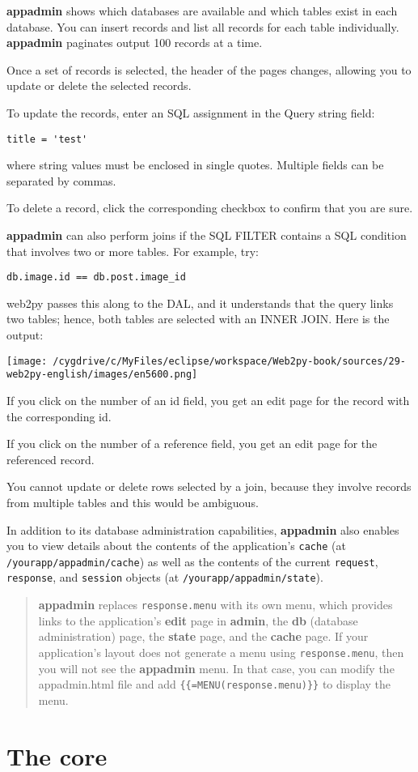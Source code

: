 \documentclass[justified,sixbynine,notoc]{tufte-book}
\def\ft{\small\tt}
\begin{document}
\begin{fullwidth}
{\bf appadmin} shows which databases are available and which tables exist in each database. You can insert records and list all records for each table individually. {\bf appadmin} paginates output 100 records at a time.

Once a set of records is selected, the header of the pages changes, allowing you to update or delete the selected records.

To update the records, enter an SQL assignment in the Query string field:
\begin{lstlisting}
title = 'test'
\end{lstlisting}
\noindent where string values must be enclosed in single quotes. Multiple fields can be separated by commas.

To delete a record, click the corresponding checkbox to confirm that you are sure.

{\bf appadmin} can also perform joins if the SQL FILTER contains a SQL condition that involves two or more tables. For example, try:
\begin{lstlisting}
db.image.id == db.post.image_id
\end{lstlisting}
\noindent web2py passes this along to the DAL, and it understands that the query links two tables; hence, both tables are selected with an INNER JOIN. Here is the output:


\goodbreak\begin{center}\texttt{[image: /cygdrive/c/MyFiles/eclipse/workspace/Web2py-book/sources/29-web2py-english/images/en5600.png]}\end{center}


If you click on the number of an id field, you get an edit page for the record with the corresponding id.

If you click on the number of a reference field, you get an edit page for the referenced record.

You cannot update or delete rows selected by a join, because they involve records from multiple tables and this would be ambiguous.

In addition to its database administration capabilities, {\bf appadmin} also enables you to view details about the contents of the application's {\ft cache} (at {\ft /yourapp/appadmin/cache}) as well as the contents of the current {\ft request}, {\ft response}, and {\ft session} objects (at {\ft /yourapp/appadmin/state}).

\begin{quote}{\bf appadmin} replaces {\ft response.menu} with its own menu, which provides links to the application's {\bf edit} page in {\bf admin}, the {\bf db} (database administration) page, the {\bf state} page, and the {\bf cache} page. If your application's layout does not generate a menu using {\ft response.menu}, then you will not see the {\bf appadmin} menu. In that case, you can modify the appadmin.html file and add {\ft \{\{=MENU(response.menu)\}\}} to display the menu.\end{quote}
\goodbreak\chapter{The core}


\end{fullwidth}
\end{document}
